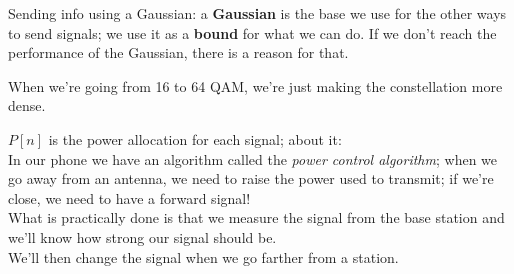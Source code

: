 \documentclass[a4paper, 12pt]{book}
\begin{document}
\noindent{}
\vspace{1em}

\noindent{}



Sending info using a Gaussian: a \textbf{Gaussian} is the base we use for the other ways to send signals; we use it as a \textbf{bound} for what we can do.
If we don't reach the performance of the Gaussian, there is a reason for that.

When we're going from 16 to 64 QAM, we're just making the constellation more dense.

\noindent\colorbox{green!10}{
    \begin{minipage}{\dimexpr\linewidth-2\fboxsep}
        $P[n]$ is the power allocation for each signal; about it: \\
        In our phone we have an algorithm called the \textit{power control algorithm}; when we go away from an antenna, we need to raise the power used to transmit; if we're close, we need to have a forward signal! \\
        What is practically done is that we measure the signal from the base station and we'll know how strong our signal should be. \\
        We'll then change the signal when we go farther from a station.
    \end{minipage}
}
\end{document}
